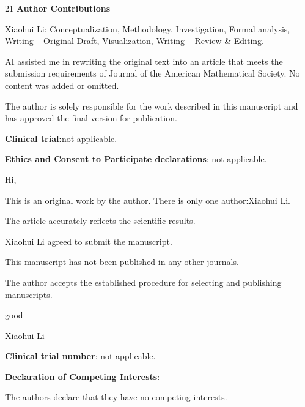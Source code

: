 \documentclass[11pt,a4paper]{article}
\begin{document}
\begin{thebibliography}{21}
 \textbf{\textbf{Author Contributions}}

Xiaohui Li: Conceptualization, Methodology, Investigation, Formal analysis, Writing – Original Draft, Visualization, Writing – Review \& Editing.

AI assisted me in rewriting the original text into an article that meets the submission requirements of Journal of the American Mathematical Society. No content was added or omitted.

 The author is solely responsible for the work described in this manuscript and has approved the final version for publication.

 \textbf{\textbf{Clinical trial:}}not applicable.

 \textbf{\textbf{Ethics and Consent to Participate declarations}}: not applicable.

 Hi,

This is an original work by the author. There is only one author:Xiaohui Li.

The article accurately reflects the scientific results.

Xiaohui Li agreed to submit the manuscript.

This manuscript has not been published in any other journals.

The author accepts the established procedure for selecting and publishing manuscripts.

good

Xiaohui Li



 \textbf{\textbf{Clinical trial number}}: not applicable.
 
 \textbf{\textbf{Declaration of Competing Interests}}: 

The authors declare that they have no competing interests.


\end{thebibliography}
\end{document}
